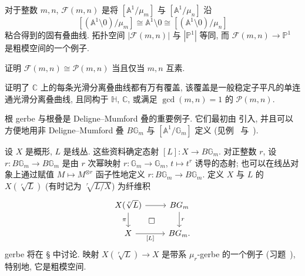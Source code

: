 \begin{example}[足球曲线]\label{src:4.9.18}
对于整数 $m,n$,  $\mathcal F(m,n)$ 是将 $[\mathbb A^1/\mu_m]$ 与 $[\mathbb A^1/\mu_n]$ 沿
\[
[(\mathbb A^1\setminus0)/\mu_m]\cong\mathbb A^1\setminus0
\cong[(\mathbb A^1\setminus0)/\mu_n]
\]
粘合得到的固有叠曲线. 拓扑空间 $|\mathcal F(m,n)|$ 与 $|\mathbb P^1|$ 等同, 而 $\mathcal F(m,n)\to\mathbb P^1$ 是粗模空间的一个例子.
\end{example}
\begin{exercise}\label{src:4.9.19}
证明 $\mathcal F(m,n)\cong\mathcal P(m,n)$ 当且仅当 $m,n$ 互素.
\end{exercise}
\begin{remark}[叠曲线的单值化]\label{src:4.9.20}
\cite{BN06} 证明了 $\mathbb C$ 上的每条光滑分离叠曲线都有万有覆盖, 该覆盖是一般稳定子平凡的单连通光滑分离叠曲线, 且同构于 $\mathbb H$, $\mathbb C$, 或满足 $\gcd(m,n)=1$ 的 $\mathcal P(m,n)$.
\end{remark}
根 gerbe 与根叠是 Deligne--Mumford 叠的重要例子. 它们最初由 \cite[\S$2$]{Cad07} 引入, 并且可以方便地用非 Deligne--Mumford 叠 $B\mathbb G_m$ 与 $[\mathbb A^1/\mathbb G_m]$ 定义 (见例~ 与~).
\begin{example}[根 gerbe]\label{src:4.9.21}
设 $X$ 是概形, $L$ 是线丛. 这些资料确定态射 $[L]:X\to B\mathbb G_m$. 对正整数 $r$, 设 $r:B\mathbb G_m\to B\mathbb G_m$ 是由 $r$ 次幂映射 $r:\mathbb G_m\to\mathbb G_m$, $t\mapsto t^r$ 诱导的态射; 也可以在线丛对象上通过赋值 $M\mapsto M^{\otimes r}$ 函子性地定义 $r:B\mathbb G_m\to B\mathbb G_m$. 定义 $X$ 与 $L$ 的  $X(\sqrt[r]{L})$ (有时记为 $\sqrt[r]{L/X}$) 为纤维积
\[
\begin{tikzcd}
X(\sqrt[r]{L})\arrow[r]\arrow[d,"\pi"']&B\mathbb G_m\arrow[d,"r"]\\
X\arrow[r,"{[L]}"']\arrow[ur,phantom,"\square" description]&B\mathbb G_m.
\end{tikzcd}
\]
gerbe 将在 \S{} 中讨论. 映射 $X(\sqrt[r]{L})\to X$ 是带系 $\mu_r$-gerbe 的一个例子 (习题~), 特别地, 它是粗模空间.
\end{example}
\newpage
